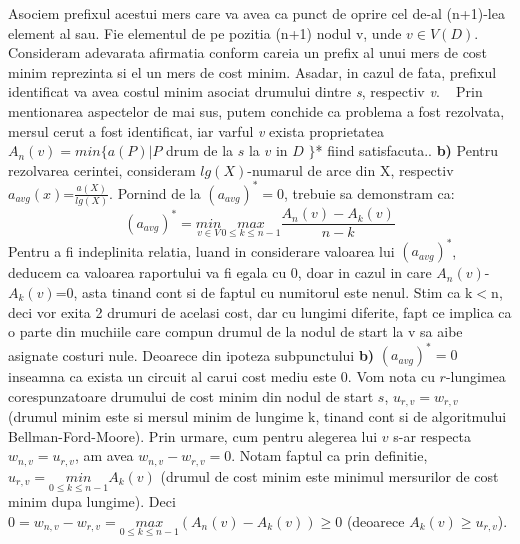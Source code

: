 \documentclass{article}
\begin{document}
Asociem prefixul acestui mers care va avea ca punct de oprire cel de-al (n+1)-lea element al sau. Fie elementul de pe pozitia (n+1) nodul v, unde $v \in V(D)$. Consideram adevarata afirmatia conform careia un prefix al unui mers de cost minim reprezinta si el un mers de cost minim. Asadar, in cazul de fata, prefixul identificat va avea costul minim asociat drumului dintre \textit{s}, respectiv \textit{v}.
\
\newline
\newline
Prin mentionarea aspectelor de mai sus, putem conchide ca problema a fost rezolvata, mersul cerut a fost identificat, iar varful \textit{v} exista proprietatea  $A_n(v)=min\{a(P)|P$ drum de la $s$ la $v$ in $D$ $\}$* fiind satisfacuta.. 
\newline
\newline
\textbf{b)} Pentru rezolvarea cerintei, consideram $lg(X)$-numarul de arce din X, respectiv $a_{avg}(x)$=$\frac{a(X)}{lg(X)}$. Pornind de la $(a_{avg})^*=0$, trebuie sa demonstram ca:
\begin{equation}
(a_{avg})^* = \underset{v \in V}{min} \underset{0 \leq k \le n-1}{max}\frac{A_n(v) - A_k(v)}{n-k} 
\end{equation}
Pentru a fi indeplinita relatia, luand in considerare valoarea lui $(a_{avg})^*$, deducem ca valoarea raportului va fi egala cu 0, doar in cazul in care $A_n(v)$-$A_k(v)$=0, asta tinand cont si de faptul cu numitorul este nenul. Stim ca k$<$n, deci vor exita 2 drumuri de acelasi cost, dar cu lungimi diferite, fapt ce implica ca o parte din muchiile care compun drumul de la nodul de start la v sa aibe asignate costuri nule.
\newline
\newline
Deoarece din ipoteza subpunctului \textbf{b)} $(a_{avg})^*=0$ inseamna ca exista un circuit al carui cost mediu este 0. Vom nota cu $r$-lungimea corespunzatoare drumului de cost minim din nodul de start $s$, $u_{r,v} = w_{r,v}$ (drumul minim este si mersul minim de lungime k, tinand cont si de algoritmului Bellman-Ford-Moore). Prin urmare, cum pentru alegerea lui $v$ s-ar respecta $w_{n, v} = u_{r,v}$, am avea $w_{n,v}-w_{r,v}=0$.
\newline
\newline
Notam faptul ca prin definitie, $u_{r,v} =
\underset{0 \leq k \le n-1}{min}A_k(v)$ (drumul de cost minim este minimul mersurilor de cost minim dupa lungime). Deci $0 = w_{n,v}-w_{r,v} = \underset{0 \leq k \le n-1}{max}(A_n(v) - A_k(v)) \geq 0 $ (deoarece $A_k(v) \geq u_{r,v}$).
\newline
\end{document}
